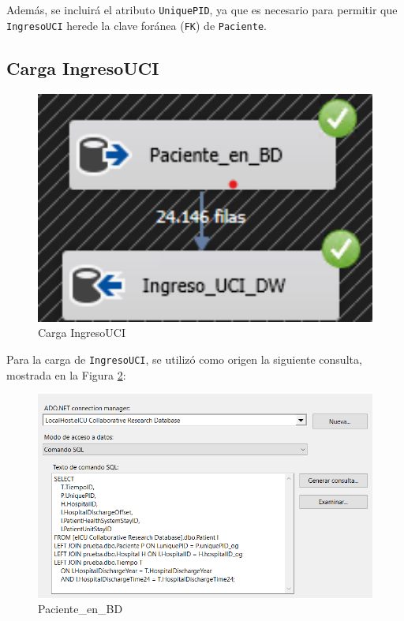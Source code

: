 \documentclass[12pt, a4paper, twoside]{article}
\begin{document}
	Además, se incluirá el atributo \texttt{UniquePID}, ya que es necesario para permitir que \texttt{IngresoUCI} herede la clave foránea (\texttt{FK}) de \texttt{Paciente}.
	
	\subsection{Carga IngresoUCI}
	
	\begin{figure}[h!]
		\centering
		\includegraphics[width=1\textwidth]{image/110_carga_ingreso.png}
		\caption{Carga IngresoUCI}
		\label{fig:19}
	\end{figure}
	
	Para la carga de \texttt{IngresoUCI}, se utilizó como origen la siguiente consulta, mostrada en la Figura \ref{fig:26}:
	
	\begin{figure}[h!]
		\centering
		\includegraphics[width=1\textwidth]{image/110_carga_ingreso_origen.png}
		\caption{Paciente\_en\_BD}
		\label{fig:26}
	\end{figure}
	
\end{document}
